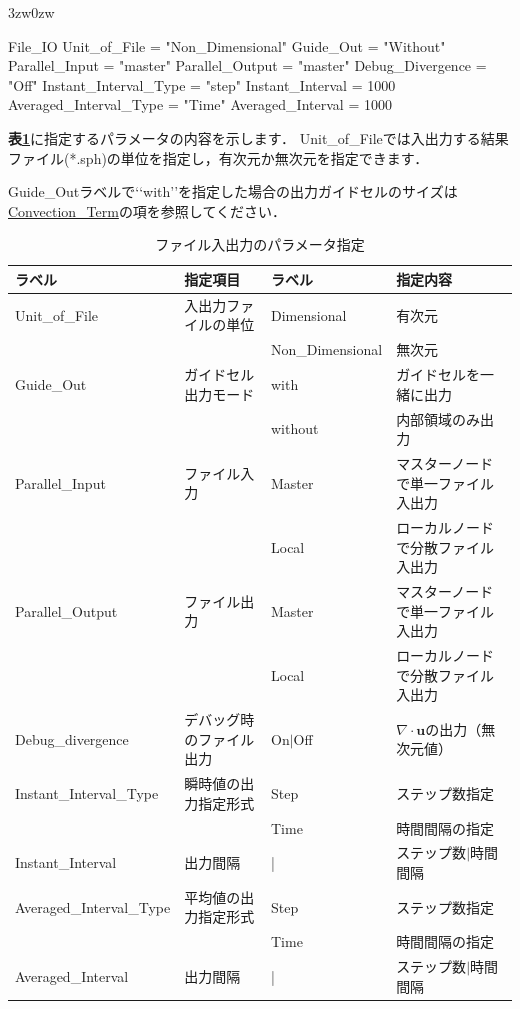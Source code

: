 \begin{indentation}{3zw}{0zw}

{\small
\begin{program}
  File_IO {
    Unit_of_File           = "Non_Dimensional"
    Guide_Out              = "Without"
    Parallel_Input         = "master"
    Parallel_Output        = "master"
    Debug_Divergence       = "Off"
    Instant_Interval_Type  = "step"
    Instant_Interval       = 1000
    Averaged_Interval_Type = "Time"
    Averaged_Interval      = 1000
  }
\end{program}
}

\textbf{表\ref{tbl:file_IO_parameter}}に指定するパラメータの内容を示します．
Unit\_of\_Fileでは入出力する結果ファイル(*.sph)の単位を指定し，有次元か無次元を指定できます．

Guide\_Outラベルで\lq\lq with\rq\rq を指定した場合の出力ガイドセルのサイズは\hyperlink{tgt:convection_term}{Convection\_Term}の項を参照してください．


\begin{table}[htdp]
\caption{ファイル入出力のパラメータ指定}
\begin{center}
\small
\begin{tabular}{llll} \toprule
ラベル & 指定項目 & ラベル & 指定内容 \\ \midrule
Unit\_of\_File & 入出力ファイルの単位 & Dimensional & 有次元\\
& & Non\_Dimensional & 無次元\\ \hline
Guide\_Out & ガイドセル出力モード & with & ガイドセルを一緒に出力\\
& & without & 内部領域のみ出力\\ \hline
Parallel\_Input & ファイル入力 & Master & マスターノードで単一ファイル入出力\\
& & Local  & ローカルノードで分散ファイル入出力 \\ \hline
Parallel\_Output & ファイル出力 & Master & マスターノードで単一ファイル入出力\\
& & Local  & ローカルノードで分散ファイル入出力 \\ \hline
Debug\_divergence & デバッグ時のファイル出力 & On$|$Off & $\nabla \cdot \bm{u}$の出力（無次元値）\\ \hline
Instant\_Interval\_Type & 瞬時値の出力指定形式 & Step & ステップ数指定\\
& & Time & 時間間隔の指定\\
Instant\_Interval & 出力間隔 & | & ステップ数$|$時間間隔\\ \hline
Averaged\_Interval\_Type & 平均値の出力指定形式 & Step & ステップ数指定\\
& & Time & 時間間隔の指定\\
Averaged\_Interval & 出力間隔 & | & ステップ数$|$時間間隔\\\bottomrule
\end{tabular}
\end{center}
\label{tbl:file_IO_parameter}
\end{table}




\end{indentation}
